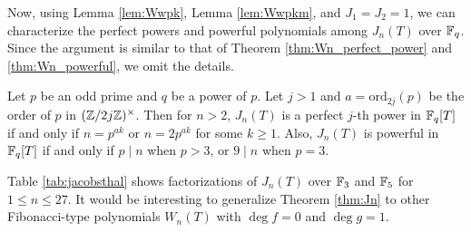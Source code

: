 Now, using Lemma \ref{lem:Wwpk}, Lemma \ref{lem:Wwpkm}, and $J_1 = J_2 = 1$, we can characterize the perfect powers and powerful polynomials among $J_n(T)$ over $\mathbb{F}_q$.
Since the argument is similar to that of Theorem \ref{thm:Wn_perfect_power} and \ref{thm:Wn_powerful}, we omit the details.
\begin{theorem}
\label{thm:Jn}
    Let $p$ be an odd prime and $q$ be a power of $p$.
    Let $j > 1$ and $a = \mathrm{ord}_{2j}(p)$ be the order of $p$ in $(\mathbb{Z} / 2j \mathbb{Z})^\times$.
    Then for $n > 2$, $J_n(T)$ is a perfect $j$-th power in $\mathbb{F}_q[T]$ if and only if $n = p^{ak}$ or $n = 2p^{ak}$ for some $k \ge 1$.
    Also, $J_n(T)$ is powerful in $\mathbb{F}_q[T]$ if and only if $p \mid n$ when $p > 3$, or $9 \mid n$ when $p = 3$.
\end{theorem}
Table \ref{tab:jacobsthal} shows factorizations of $J_n(T)$ over $\mathbb{F}_3$ and $\mathbb{F}_5$ for $1 \le n \le 27$.
It would be interesting to generalize Theorem \ref{thm:Jn} to other Fibonacci-type polynomials $W_n(T)$ with $\deg f = 0$ and $\deg g = 1$.



